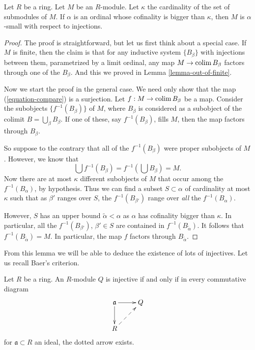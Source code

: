 \begin{proposition}
\label{proposition-modules-are-small}
Let $R$ be a ring. Let $M$ be an $R$-module.
Let $\kappa$ the cardinality of the set of submodules of $M$.
If $\alpha$ is an ordinal whose cofinality is bigger than $\kappa$,
then $M$ is $\alpha$-small with respect to injections.
\end{proposition}

\begin{proof}
The proof is straightforward, but let us first think about a special case.
If $M$ is finite, then the claim is that for any inductive system
$\{B_\beta\}$ with injections between them, parametrized by a
limit ordinal, any map $M \to \mathop{\mathrm{colim}}\nolimits B_\beta$ factors through one of
the $B_\beta$. And this we proved in
Lemma \ref{lemma-out-of-finite}.

\medskip\noindent
Now we start the proof in the general case.
We need only show that the map (\ref{equation-compare}) is a surjection.
Let $f : M \to \mathop{\mathrm{colim}}\nolimits B_\beta$ be a map.
Consider the subobjects $\{f^{-1}(B_\beta)\}$ of $M$, where $B_\beta$
is considered as a subobject of the colimit $B = \bigcup_\beta B_\beta$.
If one of these, say $f^{-1}(B_\beta)$, fills $M$,
then the map factors through $B_\beta$.

\medskip\noindent
So suppose to the contrary that all of the $f^{-1}(B_\beta)$ were proper
subobjects of $M$. However, we know that
$$
\bigcup f^{-1}(B_\beta) = f^{-1}\left(\bigcup B_\beta\right) = M.
$$
Now there are at most $\kappa$ different subobjects of $M$ that occur among
the $f^{-1}(B_\alpha)$, by hypothesis.
Thus we can find a subset $S \subset \alpha$ of cardinality at most
$\kappa$ such that as $\beta'$ ranges over $S$, the
$f^{-1}(B_{\beta'})$ range over \emph{all} the $f^{-1}(B_\alpha)$.

\medskip\noindent
However, $S$ has an upper bound $\widetilde{\alpha} < \alpha$ as
$\alpha$ has cofinality bigger than $\kappa$. In particular, all the
$f^{-1}(B_{\beta'})$, $\beta' \in S$ are contained in
$f^{-1}(B_{\widetilde{\alpha}})$.
It follows that $f^{-1}(B_{\widetilde{\alpha}}) = M$.
In particular, the map $f$ factors through $B_{\widetilde{\alpha}}$.
\end{proof}

\noindent
From this lemma we will be able to deduce the existence of lots of injectives.
Let us recall Baer's criterion.

\begin{lemma}
\label{lemma-criterion-baer}
\begin{reference}
\cite[Theorem 1]{Baer}
\end{reference}
Let $R$ be a ring. An $R$-module $Q$ is injective if and only if in every
commutative diagram
$$
\xymatrix{
\mathfrak{a} \ar[d] \ar[r] &  Q \\
R \ar@{-->}[ru]
}
$$
for $\mathfrak{a} \subset R$ an ideal, the dotted arrow exists.
\end{lemma}


